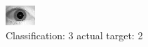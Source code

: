 \begin{figure}[h!]
\begin{center}
\includegraphics[width=0.60\columnwidth]{figures/ID1768_class_3_target_2.png}
\end{center}
\caption{ Classification: 3 actual target: 2}
\label{fig:ID1768_class_3_target_2}
\end{figure}
